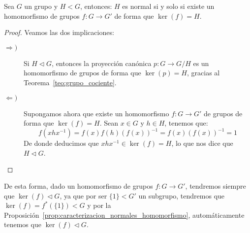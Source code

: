 \begin{prop}\label{prop:caracterizacion_normales_homomorfismo}
    Sea $G$ un grupo y $H<G$, entonces: $H$ es normal si y solo si existe un homomorfismo de grupos $f:G\to G'$ de forma que $\ker(f) = H$.
    \begin{proof}
        Veamos las dos implicaciones:
        \begin{description}
            \item [$\Longrightarrow)$] Si $H\lhd G$, entonces la proyección canónica $p:G\to G/H$ es un homomorfismo de grupos de forma que $\ker(p) = H$, gracias al Teorema~\ref{teo:grupo_cociente}.
            \item [$\Longleftarrow)$] Supongamos ahora que existe un homomorfismo $f:G\to G'$ de grupos de forma que $\ker(f) = H$. Sean $x\in G$ y $h\in H$, tenemos que:
                \begin{equation*}
                    f(xhx^{-1}) = f(x)f(h){(f(x))}^{-1} = f(x) {(f(x))}^{-1} = 1
                \end{equation*}
                De donde deducimos que $xhx^{-1}\in \ker(f) = H$, lo que nos dice que $H\lhd G$. \qedhere
        \end{description}
    \end{proof}
\end{prop}
\begin{observacion}
    De esta forma, dado un homomorfismo de grupos $f:G\to G'$, tendremos siempre que $\ker(f) \lhd G$, ya que por ser $\{1\}<G'$ un subgrupo, tendremos que $\ker(f)=f^\ast(\{1\}) < G$ y por la Proposición~\ref{prop:caracterizacion_normales_homomorfismo}, automáticamente tenemos que $\ker(f) \lhd G$.
\end{observacion}

